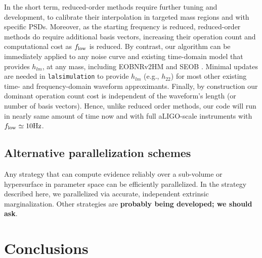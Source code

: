 \documentclass[twocolumn,prd,nofootinbib]{revtex4}
\newcommand\unit[1]{{\rm #1}}
\begin{document}
In the short term, reduced-order methods require further tuning and development, to calibrate their interpolation in
targeted mass regions and with specific PSDs.
Moreover, as the starting frequency is reduced, reduced-order methods do require additional basis vectors, increasing
their operation count and computational cost as $f_{\rm low}$ is reduced.
%
  By contrast,
our algorithm can be immediately applied to any noise curve and existing time-domain model that provides $h_{lm}$,  at any mass,
including EOBNRv2HM \cite{gw-astro-EOBNR-Calibrated-2009} and SEOB \cite{gw-astro-EOBspin-Tarrachini2012}.  Minimal
updates are  needed in \texttt{lalsimulation} to provide $h_{lm}$ (e.g., $h_{22}$) for most
other existing time- and frequency-domain waveform approximants.  
%
%
Finally, by construction our dominant operation count cost is  independent of the waveform's length (or number of basis
vectors).  Hence, unlike reduced order methods, our code will run in nearly same amount of time now and with full
aLIGO-scale instruments with $f_{\rm low}\simeq 10\unit{Hz}$.  


\subsection{Alternative parallelization schemes}
Any strategy that can compute evidence reliably over a sub-volume or hypersurface in parameter space
can be efficiently parallelized.   In the strategy described here, we parallelized via accurate, independent extrinsic marginalization.  
%
Other strategies are \textbf{probably being developed; we should ask}.




\section{Conclusions}
\label{sec:Conclude}
\end{document}
